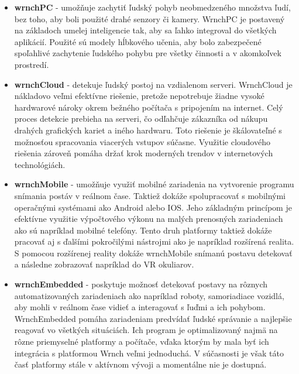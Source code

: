 \documentclass[slovak,master,dept460,male,cpp,cpdeclaration]{diploma}
\begin{document}
\begin{itemize}
\item \textbf{wrnchPC} - umožňuje zachytiť ľudský pohyb neobmedzeného množstva ľudí, bez toho, aby boli použité drahé senzory či kamery. WrnchPC je postavený na základoch  umelej inteligencie tak, aby sa ľahko integroval do všetkých aplikácií. Použité sú modely hĺbkového učenia, aby bolo zabezpečené spoľahlivé zachytenie ľudského pohybu pre všetky činnosti a v akomkoľvek prostredí.

\item \textbf{wrnchCloud} - detekuje ľudský postoj na vzdialenom serveri. WrnchCloud je nákladovo veľmi efektívne riešenie, pretože nepotrebuje žiadne vysoké hardwarové nároky okrem bežného počítača s pripojením na internet. Celý proces detekcie prebieha na serveri, čo odľahčuje zákazníka od nákupu drahých grafických kariet a iného hardwaru. Toto riešenie je škálovateľné s možnosťou spracovania viacerých vstupov súčasne. Využitie cloudového riešenia zároveň pomáha držať krok moderných trendov v internetových technológiách.

\item \textbf{wrnchMobile } - umožňuje využiť mobilné zariadenia na vytvorenie programu snímania postáv v reálnom čase. Taktiež dokáže spolupracovať s mobilnými operačnými systémami ako Android alebo IOS. Jeho základným princípom je efektívne využitie výpočtového výkonu  na malých prenosných zariadeniach ako sú napríklad mobilné telefóny. Tento druh platformy taktiež dokáže pracovať aj s ďalšími pokročilými nástrojmi ako je napríklad rozšírená realita. S pomocou rozšírenej reality dokáže wrnchMobile snímanú postavu detekovať a následne zobrazovať napríklad do VR okuliarov.

\item \textbf{wrnchEmbedded} - poskytuje možnosť detekovať postavy na rôznych automatizovaných zariadeniach ako napríklad roboty, samoriadiace vozidlá, aby mohli v reálnom čase vidieť a interagovať s ľuďmi a ich pohybom. WrnchEmbedded pomáha zariadeniam predvídať ľudské správanie a najlepšie reagovať vo všetkých situáciách. Ich program je optimalizovaný najmä na rôzne priemyselné platformy a počítače, vďaka ktorým by mala byť ich integrácia s platformou Wrnch veľmi jednoduchá. V súčasnosti je však táto časť platformy stále v aktívnom vývoji a momentálne nie je dostupná. 
\end{itemize}
\end{document}
